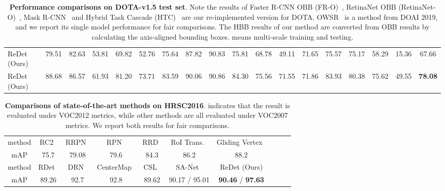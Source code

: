 \documentclass[final]{cvpr}
\begin{document}
{\begin{table*}
\begin{center}
{\begin{tabular}{l|cccccccccccccccc|c}
    ReDet (Ours)                        &79.51&82.63&53.81&69.82&52.76&75.64&87.82&90.83&75.81&68.78&49.11&71.65&75.57&75.17&58.29&15.36&67.66\\
    ReDet (Ours)                    &88.68&86.57&61.93&81.20&73.71&83.59&90.06&90.86&84.30&75.56&71.55&71.86&83.93&80.38&75.62&49.55&\textbf{78.08}\\\hline
    \end{tabular}}
\end{center}
    \vspace*{-3mm}
   \caption{\textbf{Performance comparisons on DOTA-v1.5 test set}. Note the results of Faster R-CNN OBB (FR-O)~\cite{ren2017faster}, RetinaNet OBB (RetinaNet-O)~\cite{lin2017focal}, Mask R-CNN~\cite{he2017maskrcnn} and Hybrid Task Cascade (HTC)~\cite{chen2019hybrid} are our re-implemented version for DOTA. OWSR~\cite{li2019oswr} is a method from DOAI 2019, and we report its single model performance for fair comparisons. The HBB results of our method are converted from OBB results by calculating the axis-aligned bounding boxes.  means multi-scale training and testing.}
   \vspace*{-3mm}
   \label{tab:dota15_sota}
\end{table*}


\begin{table*}
   \small
\begin{center}
\begin{tabular}{c|cccccccc|c} \hline
        method  & RC2~\cite{liu2017rrpnship} &RRPN~\cite{ma2018arbitrary}  & RPN~\cite{zhang2018toward} & RRD~\cite{liao2018rotation}  & RoI Trans.~\cite{ding2018transformer} & Gliding Vertex~\cite{xu2019gliding}  \\ 
        mAP     & 75.7                       &79.08                        & 79.6                 & 84.3                         & 86.2                                  & 88.2                                              \\ \hline
        method  & RDet~\cite{yang2019r3det} & DRN~\cite{pan2020dynamic} & CenterMap~\cite{wang2020centermap}      & CSL~\cite{yang2020arbitrary}      & SA-Net~\cite{han2020align}         &ReDet (Ours)       \\ 
        mAP     & 89.26                         & 92.7                  & 92.8                                & 89.62                             & 90.17 / 95.01  & \textbf{90.46} /  \textbf{97.63} \\ \hline
        \end{tabular}
\end{center}
   \vspace{-3mm}
  \caption{\textbf{Comparisons of state-of-the-art methods on HRSC2016}.  indicates that the result is evaluated under VOC2012 metrics, while other methods are all evaluated under VOC2007 metrics. We report both results for fair comparisons.}
   \vspace*{-1mm}
   \label{tab:hrsc2016_sota}
\end{table*}

}
\end{document}
